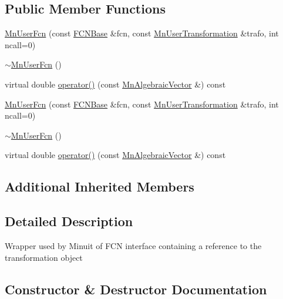 \subsection*{Public Member Functions}
\begin{DoxyCompactItemize}
\item 
\mbox{\hyperlink{classROOT_1_1Minuit2_1_1MnUserFcn_aec0ec51bd2b1e3b88f686f802f2c277f}{Mn\+User\+Fcn}} (const \mbox{\hyperlink{classROOT_1_1Minuit2_1_1FCNBase}{F\+C\+N\+Base}} \&fcn, const \mbox{\hyperlink{classROOT_1_1Minuit2_1_1MnUserTransformation}{Mn\+User\+Transformation}} \&trafo, int ncall=0)
\item 
\mbox{\hyperlink{classROOT_1_1Minuit2_1_1MnUserFcn_afa175648109f4cec5ab7dd274d0b0e75}{$\sim$\+Mn\+User\+Fcn}} ()
\item 
virtual double \mbox{\hyperlink{classROOT_1_1Minuit2_1_1MnUserFcn_a7f25ae05f1caca57bd8d1e83b9643dfe}{operator()}} (const \mbox{\hyperlink{namespaceROOT_1_1Minuit2_a62ed97730a1ca8d3fbaec64a19aa11c9}{Mn\+Algebraic\+Vector}} \&) const
\item 
\mbox{\hyperlink{classROOT_1_1Minuit2_1_1MnUserFcn_aec0ec51bd2b1e3b88f686f802f2c277f}{Mn\+User\+Fcn}} (const \mbox{\hyperlink{classROOT_1_1Minuit2_1_1FCNBase}{F\+C\+N\+Base}} \&fcn, const \mbox{\hyperlink{classROOT_1_1Minuit2_1_1MnUserTransformation}{Mn\+User\+Transformation}} \&trafo, int ncall=0)
\item 
\mbox{\hyperlink{classROOT_1_1Minuit2_1_1MnUserFcn_afa175648109f4cec5ab7dd274d0b0e75}{$\sim$\+Mn\+User\+Fcn}} ()
\item 
virtual double \mbox{\hyperlink{classROOT_1_1Minuit2_1_1MnUserFcn_aad007634c740a70ebb8f5acb0a7cfede}{operator()}} (const \mbox{\hyperlink{namespaceROOT_1_1Minuit2_a62ed97730a1ca8d3fbaec64a19aa11c9}{Mn\+Algebraic\+Vector}} \&) const
\end{DoxyCompactItemize}
\subsection*{Additional Inherited Members}


\subsection{Detailed Description}
Wrapper used by Minuit of F\+CN interface containing a reference to the transformation object 

\subsection{Constructor \& Destructor Documentation}
\mbox{\label{classROOT_1_1Minuit2_1_1MnUserFcn_aec0ec51bd2b1e3b88f686f802f2c277f}} 
